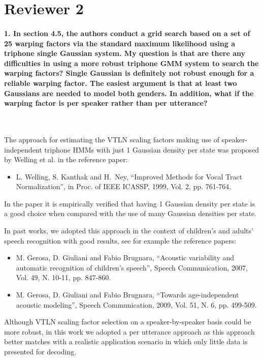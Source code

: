 \documentclass[]{article}
\begin{document}
\section{Reviewer 2}

\paragraph{1. In section 4.5, the authors conduct a grid search based on a set of 25 warping factors via the standard maximum likelihood using a triphone single Gaussian system. My question is that are there any difficulties in using a more robust triphone GMM system to search the warping factors? Single Gaussian is definitely not robust enough for a reliable warping factor. The easiest argument is that at least two Gaussians are needed to model both genders. In addition, what if the warping factor is per speaker rather than per utterance?}

~

The   approach  for  estimating   the  VTLN   scaling factors  making   use  of
speaker-independent  triphone  HMMs  with  just 1 Gaussian density  per  state  was
proposed by Welling et al. in the reference paper:
\begin{itemize}
\item L. Welling, S. Kanthak and  H.~Ney, ``Improved Methods for Vocal Tract                                              
Normalization'', in Proc. of IEEE ICASSP, 1999, Vol. 2, pp. 761-764.
\end{itemize}

In the paper it is empirically verified that having 1 Gaussian density
per state is a good  choice when compared
with the use of many Gaussian densities per state.

In past works, we  adopted this approach  in the context  of children's
and adults' speech recognition  with good results,  see for example  the reference
papers:

\begin{itemize}
\item M. Gerosa, D. Giuliani  and Fabio Brugnara, ``Acoustic variability and
automatic recognition of children's speech'', Speech Communication,
2007, Vol. 49, N. 10-11, pp. 847-860.
\item M. Gerosa, D. Giuliani and Fabio Brugnara, ``Towards age-independent acoustic modeling'',
Speech Communication, 2009, Vol. 51, N. 6, pp. 499-509.
\end{itemize}

Although VTLN scaling factor selection on a speaker-by-speaker basis
could be more robust, in this work we adopted a per utterance approach
as this approach better matches with a realistic application scenario
in which only little data is presented for decoding.
\end{document}
